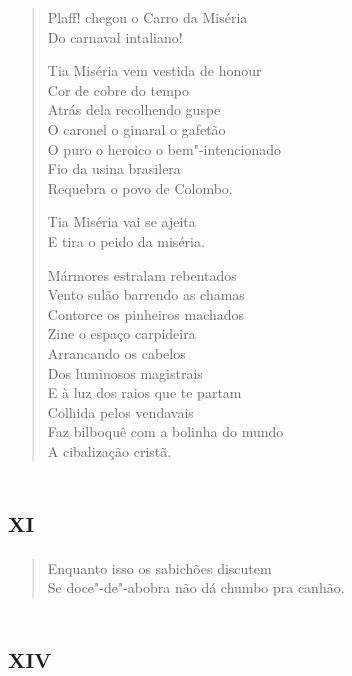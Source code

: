 \begin{verse}
Plaff! chegou o Carro da Miséria\\
Do carnaval intaliano!

Tia Miséria vem vestida de honour\\
Cor de cobre do tempo\\
Atrás dela recolhendo guspe\\
O caronel o ginaral o gafetão\\
O puro o heroico o bem"-intencionado\\
Fio da usina brasilera\\
Requebra o povo de Colombo.

Tia Miséria vai se ajeita\\
E tira o peido da miséria.

Mármores estralam rebentados\\
Vento sulão barrendo as chamas\\
Contorce os pinheiros machados\\
Zine o espaço carpideira\\
Arrancando os cabelos\\
Dos luminosos magistrais\\
E à luz dos raios que te partam\\
Colhida pelos vendavais\\
Faz bilboquê com a bolinha do mundo\\
A cibalização cristã.
\end{verse}

\chapter[«Enquanto isso os sabichões discutem»]{\textsc{xi}}

\begin{verse}
Enquanto isso os sabichões discutem\\
Se doce"-de"-abobra não dá chumbo pra canhão.
\end{verse}

\chapter[«Vou"-me embora vou"-me embora»]{\textsc{xiv}}

